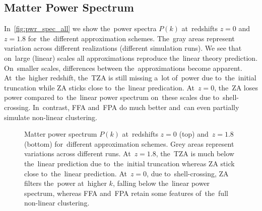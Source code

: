 \subsection{Matter Power Spectrum}
\label{sec:pwr_spec}
In~\autoref{fig:pwr_spec_all} we show the~power spectra $P(k)$ at~redshifts $z=0$ and~$z=1.8$ for~the~different approximation schemes. The~gray areas represent variation across different realizations (different simulation runs). We see that on~large (linear) scales all approximations reproduce the~linear theory prediction. On~smaller scales, differences between the~approximations become apparent. At~the~higher redshift, the~TZA is still missing a~lot of~power due to~the~initial truncation while ZA sticks close to~the~linear predication. At~$z=0$, the~ZA loses power compared to~the~linear power spectrum on~these scales due to~shell-crossing. In~contrast, FFA and~FPA do much better and~can even partially simulate non-linear clustering.

\begin{figure}[!hbt]
\centering
	\begin{subfigure}{0.9\textwidth}
	\end{subfigure}
	\begin{subfigure}{0.9\textwidth}
	\end{subfigure}
	\begin{subfigure}{0.9\textwidth}
	\end{subfigure}%
	\caption{Matter power spectrum $P(k)$ at~redshifts $z=0$ (top) and~$z=1.8$ (bottom) for~different approximation schemes. Grey areas represent variations across different runs. At~$z=1.8$, the~TZA is much below the~linear prediction due to~the~initial truncation whereas ZA stick close to~the~linear prediction. At~$z=0$, due to~shell-crossing, ZA filters the~power at~higher $k$, falling below the~linear power spectrum, whereas FFA and~FPA retain some features of~the~full non-linear clustering.}
    \label{fig:pwr_spec_all}
\end{figure}

